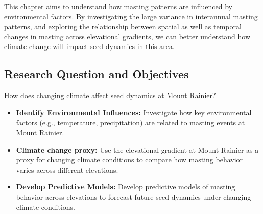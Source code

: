\documentclass[11pt,letter]{article}
\begin{document}
This chapter aims to understand how masting patterns are influenced by environmental factors. By investigating the large variance in interannual masting patterns, and exploring the relationship between spatial as well as temporal changes in masting across elevational gradients, we can better understand how climate change will impact seed dynamics in this area.

\subsection{Research Question and Objectives}
How does changing climate affect seed dynamics at Mount Rainier?
\begin{itemize}
\item\textbf{Identify Environmental Influences:} Investigate how key environmental factors (e.g., temperature, precipitation) are related to masting events at Mount Rainier.
\item\textbf{Climate change proxy:} Use the elevational gradient at Mount Rainier as a proxy for changing climate conditions to compare how masting behavior varies across different elevations.
\item\textbf{Develop Predictive Models:} Develop predictive models of masting behavior across elevations to forecast future seed dynamics under changing climate conditions.
\end{itemize}
\end{document}

